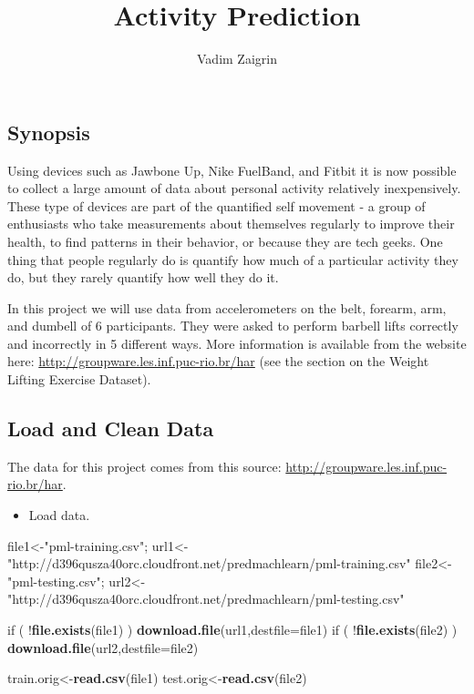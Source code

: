 \documentclass[]{article}
\title{Activity Prediction}
\author{Vadim Zaigrin}
\date{}
\newenvironment{Shaded}{\begin{snugshade}}{\end{snugshade}}
\newcommand{\KeywordTok}[1]{\textcolor[rgb]{0.13,0.29,0.53}{\textbf{{#1}}}}
\newcommand{\DataTypeTok}[1]{\textcolor[rgb]{0.13,0.29,0.53}{{#1}}}
\newcommand{\StringTok}[1]{\textcolor[rgb]{0.31,0.60,0.02}{{#1}}}
\newcommand{\NormalTok}[1]{{#1}}
\begin{document}
\maketitle


\subsection{Synopsis}\label{synopsis}

Using devices such as Jawbone Up, Nike FuelBand, and Fitbit it is now
possible to collect a large amount of data about personal activity
relatively inexpensively. These type of devices are part of the
quantified self movement - a group of enthusiasts who take measurements
about themselves regularly to improve their health, to find patterns in
their behavior, or because they are tech geeks. One thing that people
regularly do is quantify how much of a particular activity they do, but
they rarely quantify how well they do it.

In this project we will use data from accelerometers on the belt,
forearm, arm, and dumbell of 6 participants. They were asked to perform
barbell lifts correctly and incorrectly in 5 different ways. More
information is available from the website here:
\url{http://groupware.les.inf.puc-rio.br/har} (see the section on the
Weight Lifting Exercise Dataset).

\subsection{Load and Clean Data}\label{load-and-clean-data}

The data for this project comes from this source:
\url{http://groupware.les.inf.puc-rio.br/har}.

\begin{itemize}
\itemsep1pt\parskip0pt
\item
  Load data.
\end{itemize}

\begin{Shaded}
\begin{Highlighting}[]
\NormalTok{file1<-}\StringTok{"pml-training.csv"}\NormalTok{; url1<-}\StringTok{"http://d396qusza40orc.cloudfront.net/predmachlearn/pml-training.csv"}
\NormalTok{file2<-}\StringTok{"pml-testing.csv"}\NormalTok{; url2<-}\StringTok{"http://d396qusza40orc.cloudfront.net/predmachlearn/pml-testing.csv"}

\NormalTok{if ( !}\KeywordTok{file.exists}\NormalTok{(file1) )  }\KeywordTok{download.file}\NormalTok{(url1,}\DataTypeTok{destfile=}\NormalTok{file1)}
\NormalTok{if ( !}\KeywordTok{file.exists}\NormalTok{(file2) )  }\KeywordTok{download.file}\NormalTok{(url2,}\DataTypeTok{destfile=}\NormalTok{file2)}

\NormalTok{train.orig<-}\KeywordTok{read.csv}\NormalTok{(file1)}
\NormalTok{test.orig<-}\KeywordTok{read.csv}\NormalTok{(file2)}
\end{Highlighting}
\end{Shaded}
\end{document}
